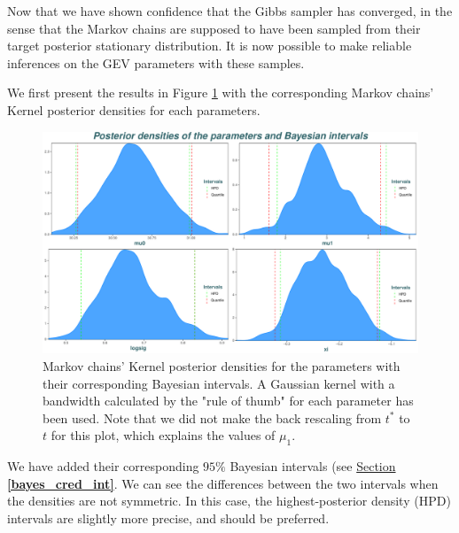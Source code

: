Now that we have shown confidence that the Gibbs sampler has converged, in the sense that the Markov chains are supposed to have been sampled from their target posterior stationary distribution. It is now possible to make reliable inferences on the GEV parameters with these samples.

We first present the results in Figure \ref{fig:postdens} with the corresponding Markov chains' Kernel posterior densities for each parameters.
\begin{figure}[!htb]
	\centering	\includegraphics[width=0.8\linewidth]{postdens.pdf}\caption{Markov chains' Kernel posterior densities for the parameters with their corresponding Bayesian intervals. A Gaussian kernel with a bandwidth calculated by the \citet[pp.48, (3.31)]{silverman_1986} "rule of thumb" for each parameter has been used. Note that we did not make the back rescaling from $t^*$ to $t$ for this plot, which explains the values of $\mu_1$.}\label{fig:postdens}
\end{figure}
 We have added their corresponding $95\%$ Bayesian intervals (see \hyperref[bayes_cred_int]{Section \textbf{\ref{bayes_cred_int}}}. 
We can see the differences between the two intervals when the densities are not symmetric. In this case, the highest-posterior density (HPD) intervals are slightly more precise, and should be preferred.

